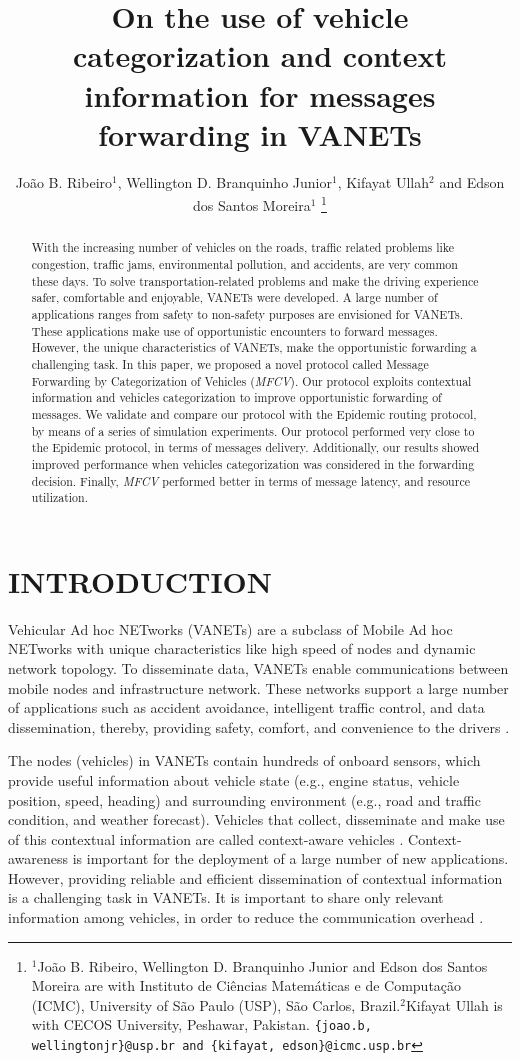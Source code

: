 \documentclass[letterpaper, 10 pt, conference]{ieeeconf}  %
\title{\LARGE \bf On the use of vehicle categorization and context information for messages forwarding in VANETs}
\author{João B. Ribeiro$^{1}$, Wellington D. Branquinho Junior$^{1}$, Kifayat Ullah$^{2}$ and Edson dos Santos Moreira$^{1}$
\thanks{$^{1}$João B. Ribeiro, Wellington D. Branquinho Junior and Edson dos Santos Moreira are with Instituto de Ciências Matemáticas e de Computação (ICMC), University of São Paulo (USP), São Carlos, Brazil.$^{2}$Kifayat Ullah is with CECOS University, Peshawar, Pakistan.
    \tt\small \{joao.b, wellingtonjr\}@usp.br and \{kifayat, edson\}@icmc.usp.br}
}
\begin{document}
\maketitle
\thispagestyle{empty}
\pagestyle{empty}

\begin{abstract}

With the increasing number of vehicles on the roads, traffic related problems like congestion, traffic jams, environmental pollution, and accidents, are very common these days. To solve transportation-related problems and make the driving experience safer, comfortable and enjoyable, VANETs were developed. A large number of applications ranges from safety to non-safety purposes are envisioned for VANETs. These applications make use of opportunistic encounters to forward messages. However, the unique characteristics of VANETs, make the opportunistic forwarding a challenging task. In this paper, we proposed a novel protocol called Message Forwarding by Categorization of Vehicles (\emph{MFCV}). Our protocol exploits contextual information and vehicles categorization to improve opportunistic forwarding of messages. We validate and compare our protocol with the Epidemic routing protocol, by means of a series of simulation experiments. Our protocol performed very close to the Epidemic protocol, in terms of messages delivery. Additionally, our results showed improved performance when vehicles categorization was considered in the forwarding decision. Finally, \emph{MFCV} performed better in terms of message latency, and resource utilization.

\end{abstract}

\IEEEpeerreviewmaketitle

\section{INTRODUCTION}

Vehicular Ad hoc NETworks (VANETs) are a subclass of Mobile Ad hoc NETworks with unique characteristics like high speed of nodes and dynamic network topology. To disseminate data, VANETs enable communications between mobile nodes and infrastructure network. These networks support a large number of applications such as accident avoidance, intelligent traffic control, and data dissemination, thereby, providing safety, comfort, and convenience to the drivers \cite{conprova2013}.

The nodes (vehicles) in VANETs contain hundreds of onboard sensors, which provide useful information about vehicle state (e.g., engine status, vehicle position, speed, heading) and surrounding environment (e.g., road and traffic condition, and weather forecast). Vehicles that collect, disseminate and make use of this contextual information are called context-aware vehicles \cite{grilli2009}. Context-awareness is important for the deployment of a large number of new applications. However, providing reliable and efficient dissemination of contextual information is a challenging task in VANETs. It is important to share only relevant information among vehicles, in order to reduce the communication overhead \cite{kumar2015}.
\end{document}
